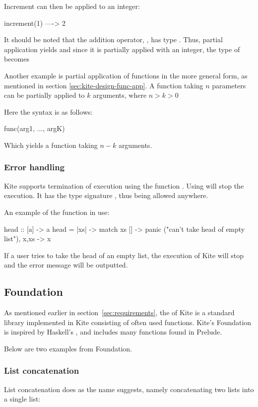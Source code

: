Increment can then be applied to an integer:

\begin{kite}
increment(1) ----> 2
\end{kite}

It should be noted that the addition operator, \code{+}, has type . Thus, partial application yields  and since
it is partially applied with an integer, the type of 
becomes 

Another example is partial application of functions in the more general form, as mentioned in section \ref{sec:kite-design-func-app}. A function taking $n$ parameters can be partially applied to $k$ arguments, where $n > k > 0$

Here the syntax is as follows:
\begin{kite}
func(arg1, ..., argK)
\end{kite}
Which yields a function taking $n - k$ arguments.

\subsubsection{Error handling}
Kite supports termination of execution using the function . Using  will stop the execution. It has the type signature , thus being allowed anywhere.

An example of the  function in use:
\begin{kite}
head :: [a] -> a
head = |xs| -> {
  match xs {
    [] -> panic ("can't take head of empty list"),
    x,xs -> x
  }
}
\end{kite}
If a user tries to take the head of an empty list, the execution of Kite will stop and the error message will be outputted.


\subsection{Foundation}
As mentioned earlier in section~\ref{sec:requirements}, the  of Kite is a standard library implemented in Kite consisting of often used functions. Kite's Foundation is inspired by Haskell's , and includes many functions found in
Prelude.

Below are two examples from Foundation.

\subsubsection{List concatenation}
List concatenation does as the name suggests, namely concatenating two lists into a single list:


